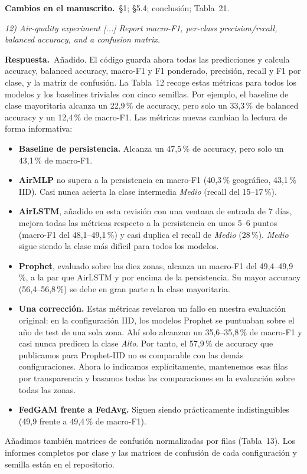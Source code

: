 \documentclass[11pt,a4paper]{article}
\newenvironment{comment}{\par\medskip\noindent\begin{minipage}{\linewidth}\color{blue!45!black}\itshape}{\end{minipage}\par}
\newcommand{\reply}{\par\smallskip\noindent\textbf{Respuesta.}~}
\newcommand{\changes}{\par\smallskip\noindent\textbf{Cambios en el manuscrito.}~}
\begin{document}
\changes \S1; \S5.4; conclusión; Tabla~21.

\begin{comment}
12) Air-quality experiment [...] Report macro-F1, per-class precision/recall, balanced accuracy, and a confusion matrix.
\end{comment}
\reply Añadido. El código guarda ahora todas las predicciones y calcula accuracy, balanced accuracy, macro-F1 y F1 ponderado, precisión, recall y F1 por clase, y la matriz de confusión. La Tabla~12 recoge estas métricas para todos los modelos y los baselines triviales con cinco semillas. Por ejemplo, el baseline de clase mayoritaria alcanza un 22,9\,\% de accuracy, pero solo un 33,3\,\% de balanced accuracy y un 12,4\,\% de macro-F1. Las métricas nuevas cambian la lectura de forma informativa:
\begin{itemize}[leftmargin=1.3em,itemsep=0.1em]
\item \textbf{Baseline de persistencia.} Alcanza un 47,5\,\% de accuracy, pero solo un 43,1\,\% de macro-F1.
\item \textbf{AirMLP} no supera a la persistencia en macro-F1 (40,3\,\% geográfico, 43,1\,\% IID). Casi nunca acierta la clase intermedia \textit{Medio} (recall del 15--17\,\%).
\item \textbf{AirLSTM}, añadido en esta revisión con una ventana de entrada de 7 días, mejora todas las métricas respecto a la persistencia en unos 5--6 puntos (macro-F1 del 48,1--49,1\,\%) y casi duplica el recall de \textit{Medio} (28\,\%). \textit{Medio} sigue siendo la clase más difícil para todos los modelos.
\item \textbf{Prophet}, evaluado sobre las diez zonas, alcanza un macro-F1 del 49,4--49,9\,\%, a la par que AirLSTM y por encima de la persistencia. Su mayor accuracy (56,4--56,8\,\%) se debe en gran parte a la clase mayoritaria.
\item \textbf{Una corrección.} Estas métricas revelaron un fallo en nuestra evaluación original: en la configuración IID, los modelos Prophet se puntuaban sobre el año de test de una sola zona. Ahí solo alcanzan un 35,6--35,8\,\% de macro-F1 y casi nunca predicen la clase \textit{Alto}. Por tanto, el 57,9\,\% de accuracy que publicamos para Prophet-IID no es comparable con las demás configuraciones. Ahora lo indicamos explícitamente, mantenemos esas filas por transparencia y basamos todas las comparaciones en la evaluación sobre todas las zonas.
\item \textbf{FedGAM frente a FedAvg.} Siguen siendo prácticamente indistinguibles (49,9 frente a 49,4\,\% de macro-F1).
\end{itemize}
Añadimos también matrices de confusión normalizadas por filas (Tabla~13). Los informes completos por clase y las matrices de confusión de cada configuración y semilla están en el repositorio.
\end{document}
